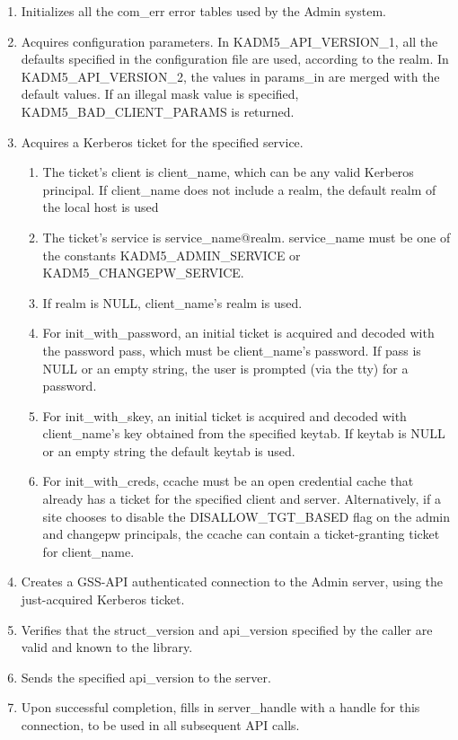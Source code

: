\begin{enumerate}
\item Initializes all the com_err error tables used by the Admin
system.

\item Acquires configuration parameters.  In KADM5_API_VERSION_1, all
the defaults specified in the configuration file are used, according
to the realm.  In KADM5_API_VERSION_2, the values in params_in are
merged with the default values.  If an illegal mask value is
specified, KADM5_BAD_CLIENT_PARAMS is returned.

\item Acquires a Kerberos ticket for the specified service.

\begin{enumerate}
\item The ticket's client is client_name, which can be any valid
Kerberos principal.  If client_name does not include a realm, the
default realm of the local host is used
\item The ticket's service is service_name@realm.  service_name must
be one of the constants KADM5_ADMIN_SERVICE or
KADM5_CHANGEPW_SERVICE.
\item If realm is NULL, client_name's realm is used.

\item For init_with_password, an initial ticket is acquired and
decoded with the password pass, which must be client_name's password.
If pass is NULL or an empty string, the user is prompted (via the tty)
for a password.

\item For init_with_skey, an initial ticket is acquired and decoded
with client_name's key obtained from the specified keytab.  If keytab
is NULL or an empty string the default keytab is used.

\item For init_with_creds, ccache must be an open credential cache
that already has a ticket for the specified client and server.
Alternatively, if a site chooses to disable the DISALLOW_TGT_BASED
flag on the admin and changepw principals, the ccache can contain a
ticket-granting ticket for client_name.
\end{enumerate}

\item Creates a GSS-API authenticated connection to the Admin server,
using the just-acquired Kerberos ticket.

\item Verifies that the struct_version and api_version specified by
the caller are valid and known to the library.

\item Sends the specified api_version to the server.

\item Upon successful completion, fills in server_handle with a handle
for this connection, to be used in all subsequent API calls.
\end{enumerate}

